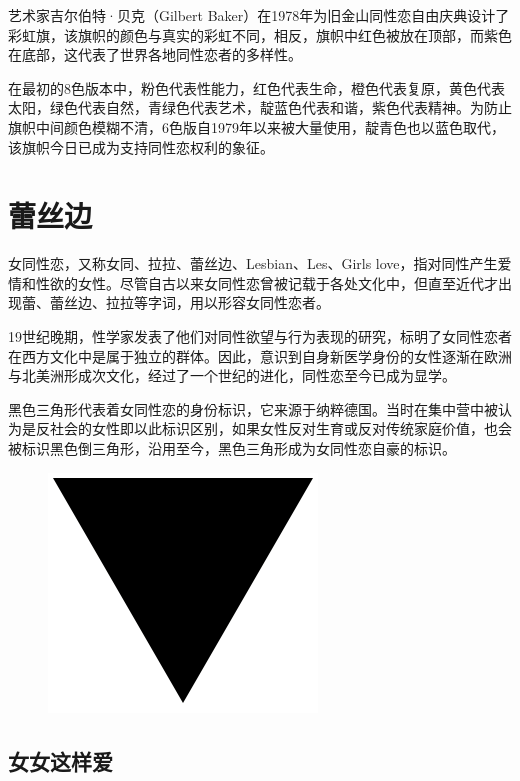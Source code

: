 \documentclass[12pt,UTF8]{ctexbook}
\begin{document}
艺术家吉尔伯特·贝克（Gilbert Baker）在1978年为旧金山同性恋自由庆典设计了彩虹旗，该旗帜的颜色与真实的彩虹不同，相反，旗帜中红色被放在顶部，而紫色在底部，这代表了世界各地同性恋者的多样性。

在最初的8色版本中，粉色代表性能力，红色代表生命，橙色代表复原，黄色代表太阳，绿色代表自然，青绿色代表艺术，靛蓝色代表和谐，紫色代表精神。为防止旗帜中间颜色模糊不清，6色版自1979年以来被大量使用，靛青色也以蓝色取代，该旗帜今日已成为支持同性恋权利的象征。

\section{蕾丝边}

女同性恋，又称女同、拉拉、蕾丝边、Lesbian、Les、Girls love，指对同性产生爱情和性欲的女性。尽管自古以来女同性恋曾被记载于各处文化中，但直至近代才出现蕾、蕾丝边、拉拉等字词，用以形容女同性恋者。

19世纪晚期，性学家发表了他们对同性欲望与行为表现的研究，标明了女同性恋者在西方文化中是属于独立的群体。因此，意识到自身新医学身份的女性逐渐在欧洲与北美洲形成次文化，经过了一个世纪的进化，同性恋至今已成为显学。

黑色三角形代表着女同性恋的身份标识，它来源于纳粹德国。当时在集中营中被认为是反社会的女性即以此标识区别，如果女性反对生育或反对传统家庭价值，也会被标识黑色倒三角形，沿用至今，黑色三角形成为女同性恋自豪的标识。

\begin{figure}[H]
	\centering
	\includegraphics[width=0.7\linewidth]{9}
	\caption{}
	\label{fig:1}
\end{figure}

\subsection{女女这样爱}
\end{document}
